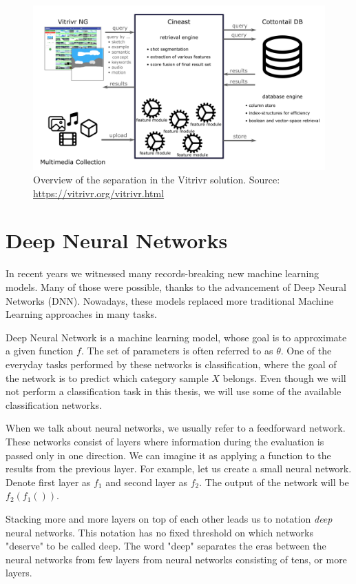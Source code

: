 \begin{figure}
    \centering
    \includegraphics[width=\linewidth]{img/vitrivr.png}
    \caption{Overview of the separation in the Vitrivr solution. Source: \url{https://vitrivr.org/vitrivr.html}}
    \label{fig:vitrivr}
\end{figure}

\section{Deep Neural Networks}

In recent years we witnessed many records-breaking new machine learning models. Many of those were possible, thanks to the advancement of Deep Neural Networks (DNN). Nowadays, these models replaced more traditional Machine Learning approaches in many tasks.

Deep Neural Network is a machine learning model, whose goal is to approximate a given function \(f\). The set of parameters is often referred to as \(\theta\). One of the everyday tasks performed by these networks is classification, where the goal of the network is to predict which category sample \(X\) belongs. Even though we will not perform a classification task in this thesis, we will use some of the available classification networks.

When we talk about neural networks, we usually refer to a feedforward network. These networks consist of layers where information during the evaluation is passed only in one direction. We can imagine it as applying a function to the results from the previous layer. For example, let us create a small neural network. Denote first layer as \(f_1\) and second layer as \(f_2\). The output of the network will be \(f_2\left(f_1\left(\right)\right)\).

Stacking more and more layers on top of each other leads us to notation \emph{deep} neural networks. This notation has no fixed threshold on which networks "deserve" to be called deep. The word "deep" separates the eras between the neural networks from few layers from neural networks consisting of tens, or more layers.  


